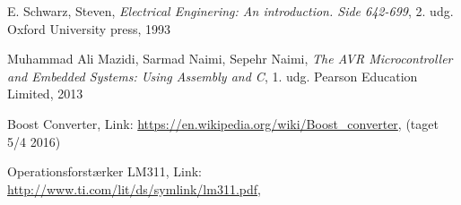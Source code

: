 \begin{thebibliography}{9}

  E. Schwarz, Steven,
  \emph{Electrical Enginering: An introduction. Side 642-699},
  2. udg.
  Oxford University press,
  1993

    Muhammad Ali Mazidi, Sarmad Naimi, Sepehr Naimi,
    \emph{The AVR Microcontroller and Embedded Systems: Using Assembly and C},
    1. udg.
    Pearson Education Limited,
    2013

      Boost Converter, Link:
    \url{https://en.wikipedia.org/wiki/Boost_converter},
      (taget 5/4 2016)


        Operationsforstærker LM311, Link:
      \url{http://www.ti.com/lit/ds/symlink/lm311.pdf},


\end{thebibliography}
